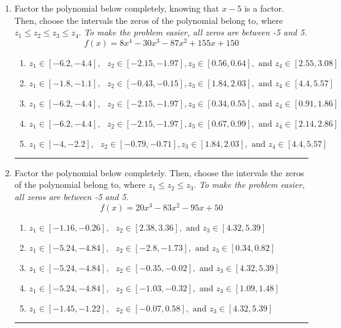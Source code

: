 \documentclass[14pt]{extbook}
\newcommand{\litem}[1]{\item#1\hspace*{-1cm}\rule{\textwidth}{0.4pt}}
\begin{document}
\begin{enumerate}
{\begin{enumerate}[label=\Alph*.]
\end{enumerate} }
\litem{
Factor the polynomial below completely, knowing that $x -5$ is a factor. Then, choose the intervals the zeros of the polynomial belong to, where $z_1 \leq z_2 \leq z_3 \leq z_4$. \textit{To make the problem easier, all zeros are between -5 and 5.}\[ f(x) = 8x^{4} -30 x^{3} -87 x^{2} +155 x + 150 \]\begin{enumerate}[label=\Alph*.]
\item \( z_1 \in [-6.2, -4.4], \text{   }  z_2 \in [-2.15, -1.97], z_3 \in [0.56, 0.64], \text{   and   } z_4 \in [2.55, 3.08] \)
\item \( z_1 \in [-1.8, -1.1], \text{   }  z_2 \in [-0.43, -0.15], z_3 \in [1.84, 2.03], \text{   and   } z_4 \in [4.4, 5.57] \)
\item \( z_1 \in [-6.2, -4.4], \text{   }  z_2 \in [-2.15, -1.97], z_3 \in [0.34, 0.55], \text{   and   } z_4 \in [0.91, 1.86] \)
\item \( z_1 \in [-6.2, -4.4], \text{   }  z_2 \in [-2.15, -1.97], z_3 \in [0.67, 0.99], \text{   and   } z_4 \in [2.14, 2.86] \)
\item \( z_1 \in [-4, -2.2], \text{   }  z_2 \in [-0.79, -0.71], z_3 \in [1.84, 2.03], \text{   and   } z_4 \in [4.4, 5.57] \)

\end{enumerate} }
\litem{
Factor the polynomial below completely. Then, choose the intervals the zeros of the polynomial belong to, where $z_1 \leq z_2 \leq z_3$. \textit{To make the problem easier, all zeros are between -5 and 5.}\[ f(x) = 20x^{3} -83 x^{2} -95 x + 50 \]\begin{enumerate}[label=\Alph*.]
\item \( z_1 \in [-1.16, -0.26], \text{   }  z_2 \in [2.38, 3.36], \text{   and   } z_3 \in [4.32, 5.39] \)
\item \( z_1 \in [-5.24, -4.84], \text{   }  z_2 \in [-2.8, -1.73], \text{   and   } z_3 \in [0.34, 0.82] \)
\item \( z_1 \in [-5.24, -4.84], \text{   }  z_2 \in [-0.35, -0.02], \text{   and   } z_3 \in [4.32, 5.39] \)
\item \( z_1 \in [-5.24, -4.84], \text{   }  z_2 \in [-1.03, -0.32], \text{   and   } z_3 \in [1.09, 1.48] \)
\item \( z_1 \in [-1.45, -1.22], \text{   }  z_2 \in [-0.07, 0.58], \text{   and   } z_3 \in [4.32, 5.39] \)


\end{enumerate}}
\end{enumerate}
\end{document}

